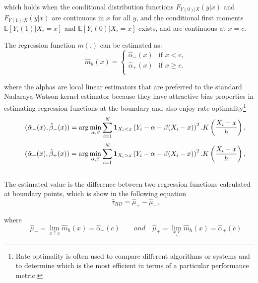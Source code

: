 \documentclass[fleqn]{article}
\begin{document}
    which holds when the conditional distribution functions $F_{Y(0)|X}(y|x)$ and $F_{Y(1)|X}(y|x)$ are continuous in $x$ for all $y$, and the conditional first moments $\mathbb{E}[Y_i(1)|X_i=x]$ and $\mathbb{E}[Y_i(0)|X_i=x]$ exists, and are continuous at $x = c$.  

    The regression function $m(.)$ can be estimated as:
    \begin{equation}
        \qquad \hat{m}_h(x) = \begin{cases}
        \hat{\alpha}_-(x) & \text{if } x < c, \\ \hat{\alpha}_+(x) & \text{if } x \ge c. \\
        \end{cases}
    \end{equation}

    where the alphas are local linear estimators that are preferred to the standard Nadaraya-Watson\cite{devroye1978uniform} kernel estimator because they have attractive bias properties in estimating regression functions at the boundary and also enjoy rate optimality\footnote{Rate optimality is often used to compare different algorithms or systems and to determine which is the most efficient in terms of a particular performance metric.}\\
    \begin{equation*}
        \qquad (\hat{\alpha}_- (x), \hat{\beta}_- (x)) = \arg\min_{\alpha, \beta} \sum_{i=1}^{N}\textbf1_{X_i<x} \left( Y_i - \alpha - \beta (X_i - x) \right)^2.K\left(\frac{X_i - x}{h}\right), \\
    \end{equation*}
    \begin{equation*}
        \qquad (\hat{\alpha}_+ (x), \hat{\beta}_+ (x)) = \arg\min_{\alpha, \beta} \sum_{i=1}^{N}\textbf1_{X_i>x} \left( Y_i - \alpha - \beta (X_i - x) \right)^2.K\left(\frac{X_i - x}{h}\right), \\
    \end{equation*} \\

    The estimated value is the difference between two regression functions calculated at boundary points, which is show in the following equation\\
    \begin{equation*}
        \qquad \hat{\tau}_{RD} = \hat{\mu}_{+} - \hat{\mu}_{-},
    \end{equation*}

    where
    \begin{equation*}
        \qquad \hat{\mu}_{-} = \lim_{x \uparrow c} \hat{m}_h(x) = \hat{\alpha}_-(c) \qquad and \quad \hat{\mu}_{+} = \lim_{x_\downarrow c} \hat{m}_h(x) = \hat{\alpha}_+(c)
    \end{equation*}
\end{document}
